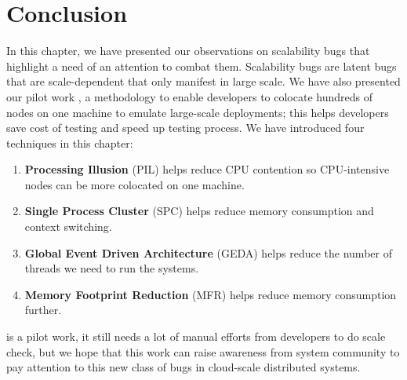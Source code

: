 \section{Conclusion}

In this chapter, we have presented our observations on scalability bugs that
highlight a need of an attention to combat them. Scalability bugs are latent
bugs that are scale-dependent that only manifest in large scale. We have also
presented our pilot work \sck, a methodology to enable developers to colocate
hundreds of nodes on one machine to emulate large-scale deployments; this helps
developers save cost of testing and speed up testing process. We have introduced
four techniques in this chapter:

\begin{enumerate}

\item {\bf Processing Illusion} (PIL) helps reduce CPU contention so
CPU-intensive nodes can be more colocated on one machine.

\item {\bf Single Process Cluster} (SPC) helps reduce memory consumption and
context switching.

\item {\bf Global Event Driven Architecture} (GEDA) helps reduce the number of
threads we need to run the systems.

\item {\bf Memory Footprint Reduction} (MFR) helps reduce memory consumption
further.

\end{enumerate}

\sck is a pilot work, it still needs a lot of manual efforts from developers to
do scale check, but we hope that this work can raise awareness from system
community to pay attention to this new class of bugs in cloud-scale distributed
systems.
